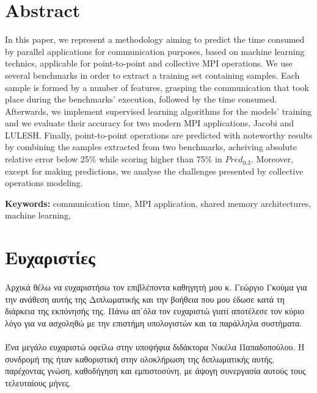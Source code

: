 \documentclass[a4paper,twoside,titlepage,11pt]{book}
\begin{document}
\section*{\centering Abstract}

In this paper, we represent a  methodology aiming to predict the time consumed by parallel applications for communication purposes, based on machine learning technics, applicable for point-to-point and collective MPI operations. We use several benchmarks in order to extract a training set containing samples. Each sample is formed by a number of features, grasping the communication that took place during the benchmarks' execution, followed by the time consumed. Afterwards, we implement supervised learning algorithms for the models' training and we evaluate their accuracy for two modern MPI applications, Jacobi and LULESH. Finally, point-to-point operations are predicted with noteworthy results by combining the samples extracted from two benchmarks, acheiving absolute relative error below 25\% while scoring higher than 75\% in $Pred_{0.3}$. Moreover, except for making predictions, we analyse the challenges presented by collective operations modeling.

\vspace*{\fill}
\textbf{Keywords:} communication time, MPI application, shared memory architectures, machine learning,
\newpage
\section*{\centering Ευχαριστίες}
\paragraph{}
Αρχικά θέλω να ευχαριστήσω τον επιβλέποντα καθηγητή μου κ. Γεώργιο Γκούμα για την ανάθεση αυτής της Διπλωματικής και την βοήθεια που μου έδωσε κατά τη διάρκεια της εκπόνησής της. Πάνω απ΄όλα τον ευχαριστώ γιατί αποτέλεσε τον κύριο λόγο για να ασχοληθώ με την επιστήμη υπολογιστών και τα παράλληλα συστήματα.
\paragraph{}
Ένα μεγάλο ευχαριστώ οφείλω στην υποψήφια διδάκτορα Νικέλα Παπαδοπούλου. Η συνδρομή της ήταν καθοριστική στην ολοκλήρωση της διπλωματικής αυτής, παρέχοντας γνώση, καθοδήγηση και εμπιστοσύνη, με άψογη συνεργασία αυτούς τους τελευταίους μήνες.
\end{document}
